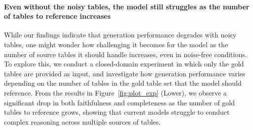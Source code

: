 \paragraph{Even without the noisy tables, the model still struggles as the number of tables to reference increases}
While our findings indicate that generation performance degrades with noisy tables, one might wonder how challenging it becomes for the model as the number of source tables it should handle increases, even in noise-free conditions.
To explore this, we conduct a closed-domain experiment in which only the gold tables are provided as input, and investigate how generation performance varies depending on the number of tables in the gold table set that the model should reference.
From the results in Figure~\ref{fig:plot_exp} (Lower), we observe a significant drop in both faithfulness and completeness as the number of gold tables to reference grows, showing that current models struggle to conduct complex reasoning across multiple sources of tables.